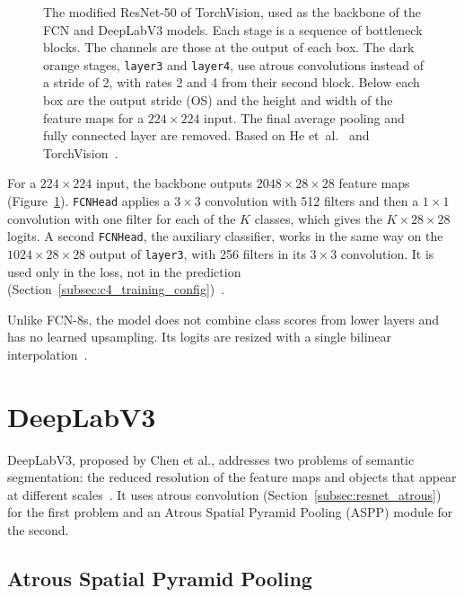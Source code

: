 \begin{figure}[!htb]
  \centering
  \resizebox{\linewidth}{!}{}%
  \caption{The modified ResNet-50 of TorchVision, used as the backbone of the FCN and DeepLabV3 models. Each stage is a sequence of bottleneck blocks. The channels are those at the output of each box. The dark orange stages, \texttt{layer3} and \texttt{layer4}, use atrous convolutions instead of a stride of 2, with rates 2 and 4 from their second block. Below each box are the output stride (OS) and the height and width of the feature maps for a $224\times224$ input. The final average pooling and fully connected layer are removed. Based on He et~al.~\cite{he2016deep} and TorchVision~\cite{torchvision_resnet,torchvision_fcn}.}
  \label{fig:resnet50}
\end{figure}

For a $224\times224$ input, the backbone outputs $2048\times28\times28$ feature maps (Figure~\ref{fig:resnet50}). \texttt{FCNHead} applies a $3\times3$ convolution with 512 filters and then a $1\times1$ convolution with one filter for each of the $K$ classes, which gives the $K\times28\times28$ logits. A second \texttt{FCNHead}, the auxiliary classifier, works in the same way on the $1024\times28\times28$ output of \texttt{layer3}, with 256 filters in its $3\times3$ convolution. It is used only in the loss, not in the prediction (Section~\ref{subsec:c4_training_config})~\cite{torchvision_fcn,torchvision_seg_utils}.

Unlike FCN-8s, the model does not combine class scores from lower layers and has no learned upsampling. Its logits are resized with a single bilinear interpolation~\cite{long2015fcn,torchvision_fcn,torchvision_seg_utils}.

\section{DeepLabV3}
\label{sec:deeplabv3_arch}

DeepLabV3, proposed by Chen et al., addresses two problems of semantic segmentation: the reduced resolution of the feature maps and objects that appear at different scales~\cite{chen2017deeplab}. It uses atrous convolution (Section~\ref{subsec:resnet_atrous}) for the first problem and an Atrous Spatial Pyramid Pooling (ASPP) module for the second.

\subsection{Atrous Spatial Pyramid Pooling}
\label{subsec:aspp_module}

